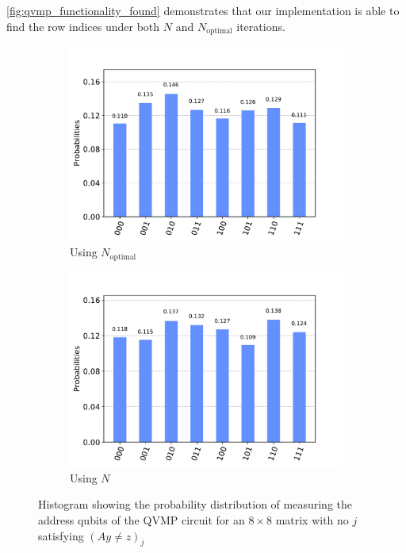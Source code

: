 \documentclass[11pt]{article}
\theoremstyle{definition}
\theoremstyle{remark}
\begin{document}
\cref{fig:qvmp_functionality_found} demonstrates that our implementation is able
to find the row indices under both $N$ and $N_{\text{optimal}}$ iterations.

\begin{figure}[h!]
  \centering
  \begin{subfigure}{0.48\textwidth}
    \includegraphics[width=\textwidth]{../../results/figures/qvmp_functionality_none_known.pdf}
    \caption{Using $N_{\text{optimal}}$}
  \end{subfigure}
  \begin{subfigure}{0.48\textwidth}
    \centering
    \includegraphics[width=\textwidth]{../../results/figures/qvmp_functionality_none_unknown.pdf}
    \caption{Using $N$}
  \end{subfigure}
  \caption{Histogram showing the probability distribution of measuring the
  address qubits of the QVMP circuit for an $8 \times 8$ matrix with no $j$
  satisfying $(Ay \neq z)_j$}
  \label{fig:qvmp_functionality_none}
\end{figure}
\end{document}

